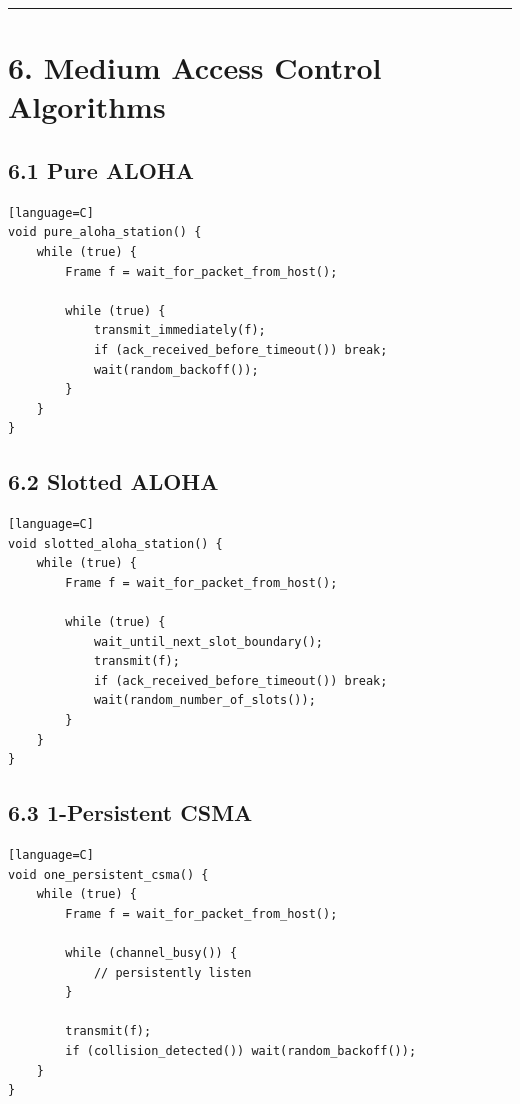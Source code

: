 \documentclass[11pt]{article}
\begin{document}
\begin{center}\rule{0.5\linewidth}{0.5pt}\end{center}

\section{6. Medium Access Control
Algorithms}\label{medium-access-control-algorithms}

\subsection{6.1 Pure ALOHA}\label{pure-aloha}

\begin{verbatim}[language=C]
void pure_aloha_station() {
    while (true) {
        Frame f = wait_for_packet_from_host();

        while (true) {
            transmit_immediately(f);
            if (ack_received_before_timeout()) break;
            wait(random_backoff());
        }
    }
}
\end{verbatim}

\subsection{6.2 Slotted ALOHA}\label{slotted-aloha}

\begin{verbatim}[language=C]
void slotted_aloha_station() {
    while (true) {
        Frame f = wait_for_packet_from_host();

        while (true) {
            wait_until_next_slot_boundary();
            transmit(f);
            if (ack_received_before_timeout()) break;
            wait(random_number_of_slots());
        }
    }
}
\end{verbatim}

\subsection{6.3 1-Persistent CSMA}\label{persistent-csma}

\begin{verbatim}[language=C]
void one_persistent_csma() {
    while (true) {
        Frame f = wait_for_packet_from_host();

        while (channel_busy()) {
            // persistently listen
        }

        transmit(f);
        if (collision_detected()) wait(random_backoff());
    }
}
\end{verbatim}
\end{document}
